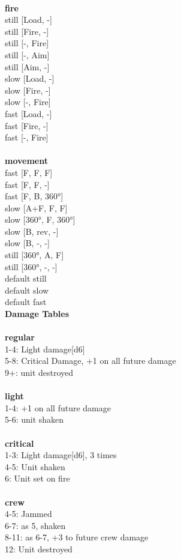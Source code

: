 \ \\ {\bf fire } \\
still [Load, -] \\
still [Fire, -] \\
still [-, Fire] \\
still [-, Aim] \\
still [Aim, -] \\
slow [Load, -] \\
slow [Fire, -] \\
slow [-, Fire] \\
fast [Load, -] \\
fast [Fire, -] \\
fast [-, Fire] \\
\ \\ {\bf movement } \\
fast [F, F, F] \\
fast [F, F, -] \\
fast [F, B, 360°] \\
slow [A+F, F, F] \\
slow [360°, F, 360°] \\
slow [B, rev, -] \\
slow [B, -, -] \\
still [360°, A, F] \\
still [360°, -, -] \\
default still \\
default slow \\
default fast \\


{\bf Damage Tables} \\
\ \\ {\bf regular } \\
1-4: Light damage[d6] \\
5-8: Critical Damage, +1 on all future damage \\
9+: unit destroyed \\
\ \\ {\bf light } \\
1-4: +1 on all future damage \\
5-6: unit shaken \\
\ \\ {\bf critical } \\
1-3: Light damage[d6], 3 times \\
4-5: Unit shaken \\
6: Unit set on fire \\
\ \\ {\bf crew } \\
4-5: Jammed \\
6-7: as 5, shaken \\
8-11: as 6-7, +3 to future crew damage \\
12: Unit destroyed \\










